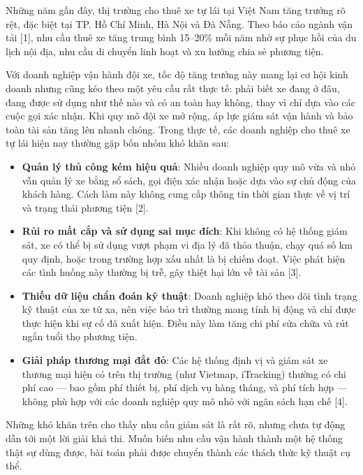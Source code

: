 \documentclass[a4paper]{extarticle}
\providecommand{\tightlist}{%
  \setlength{\itemsep}{0pt}\setlength{\parskip}{0pt}}
\begin{document}
Những năm gần đây, thị trường cho thuê xe tự lái tại Việt Nam tăng
trưởng rõ rệt, đặc biệt tại TP. Hồ Chí Minh, Hà Nội và Đà Nẵng. Theo báo
cáo ngành vận tải {[}1{]}, nhu cầu thuê xe tăng trung bình 15--20\% mỗi
năm nhờ sự phục hồi của du lịch nội địa, nhu cầu di chuyển linh hoạt và
xu hướng chia sẻ phương tiện.

Với doanh nghiệp vận hành đội xe, tốc độ tăng trưởng này mang lại cơ hội
kinh doanh nhưng cũng kéo theo một yêu cầu rất thực tế: phải biết xe
đang ở đâu, đang được sử dụng như thế nào và có an toàn hay không, thay
vì chỉ dựa vào các cuộc gọi xác nhận. Khi quy mô đội xe mở rộng, áp lực
giám sát vận hành và bảo toàn tài sản tăng lên nhanh chóng. Trong thực
tế, các doanh nghiệp cho thuê xe tự lái hiện nay thường gặp bốn nhóm khó
khăn sau:

\begin{itemize}
\tightlist
\item
  \textbf{Quản lý thủ công kém hiệu quả}: Nhiều doanh nghiệp quy mô vừa
  và nhỏ vẫn quản lý xe bằng sổ sách, gọi điện xác nhận hoặc dựa vào sự
  chủ động của khách hàng. Cách làm này không cung cấp thông tin thời
  gian thực về vị trí và trạng thái phương tiện {[}2{]}.
\item
  \textbf{Rủi ro mất cắp và sử dụng sai mục đích}: Khi không có hệ thống
  giám sát, xe có thể bị sử dụng vượt phạm vi địa lý đã thỏa thuận, chạy
  quá số km quy định, hoặc trong trường hợp xấu nhất là bị chiếm đoạt.
  Việc phát hiện các tình huống này thường bị trễ, gây thiệt hại lớn về
  tài sản {[}3{]}.
\item
  \textbf{Thiếu dữ liệu chẩn đoán kỹ thuật}: Doanh nghiệp khó theo dõi
  tình trạng kỹ thuật của xe từ xa, nên việc bảo trì thường mang tính bị
  động và chỉ được thực hiện khi sự cố đã xuất hiện. Điều này làm tăng
  chi phí sửa chữa và rút ngắn tuổi thọ phương tiện.
\item
  \textbf{Giải pháp thương mại đắt đỏ}: Các hệ thống định vị và giám sát xe thương
  mại hiện có trên thị trường (như Vietmap, iTracking) thường có chi phí
  cao --- bao gồm phí thiết bị, phí dịch vụ hàng tháng, và phí tích hợp
  --- không phù hợp với các doanh nghiệp quy mô nhỏ với ngân sách hạn
  chế {[}4{]}.
\end{itemize}

Những khó khăn trên cho thấy nhu cầu giám sát là rất rõ, nhưng chưa tự
động dẫn tới một lời giải khả thi. Muốn biến nhu cầu vận hành thành một
hệ thống thật sự dùng được, bài toán phải được chuyển thành các thách
thức kỹ thuật cụ thể.
\end{document}
